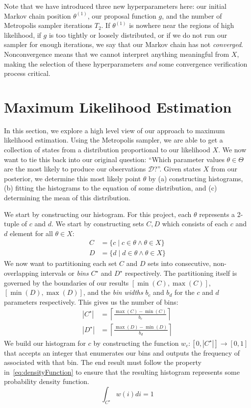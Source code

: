 Note that we have introduced three new hyperparameters here: our initial Markov chain position $\theta^{(1)}$,
our proposal function $g$, and the number of Metropolis sampler iterations $T_2$.
If $\theta^{(1)}$ is nowhere near the regions of high likelihood, if $g$ is too tightly or loosely distributed, or if we
do not run our sampler for enough iterations, we say that our Markov chain has not \emph{converged}.
Nonconvergence means that we cannot interpret anything meaningful from $X$, making the selection of these
hyperparameters \emph{and} some convergence verification process critical.

\section{Maximum Likelihood Estimation}\label{sec:maximumLikelihoodEstimation}
In this section, we explore a high level view of our approach to maximum likelihood estimation.
Using the Metropolis sampler, we are able to get a collection of states from a distribution proportional to our
likelihood $X$.
We now want to tie this back into our original question: ``Which parameter values $\theta \in \Theta$ are the most
likely to produce our observations $\mathcal{D}$?''.
Given states $X$ from our posterior, we determine this most likely point $\theta$ by (a) constructing histograms, (b)
fitting the histograms to the equation of some distribution, and (c) determining the mean of this distribution.

We start by constructing our histogram.
For this project, each $\theta$ represents a 2-tuple of $c$ and $d$.
We start by constructing sets $C, D$ which consists of each $c$ and $d$ element for all $\theta \in X$:
\begin{align}
    C &= \{c \mid c \in \theta \land \theta \in X \} \\
    D &= \{d \mid d \in \theta \land \theta \in X \}
\end{align}
We now want to partitioning each set $C$ and $D$ sets into consecutive, non-overlapping intervals or \emph{bins}
$C^\star$ and $D^\star$ respectively.
The partitioning itself is governed by the boundaries of our results $[\min(C), \max(C)]$,
$[\min(D),\max(D)]$, and the \emph{bin widths} $b_c$ and $b_d$ for the $c$ and $d$ parameters respectively.
This gives us the number of bins:
\begin{equation}
    \begin{aligned}
        | C^\star | &= \left\lceil \frac{\max(C) - \min(C)}{b_c} \right\rceil \\
        | D^\star | &= \left\lceil \frac{\max(D) - \min(D)}{b_d} \right\rceil
    \end{aligned}
\end{equation}
We build our histogram for $c$ by constructing the function $w_c : [0, |C^\star |] \rightarrow [0, 1]$ that accepts
an integer that enumerates our bins and outputs the frequency of associated with that bin.
The end result must follow the property in~\autoref{eq:densityFunction} to ensure that the resulting histogram
represents some probability density function.
\begin{equation} \label{eq:densityFunction}
    \int_{C^\star} w(i) di = 1
\end{equation}

